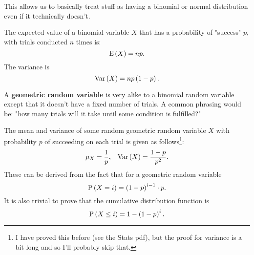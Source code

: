 This allows us to basically treat stuff as having a binomial or normal
distribution even if it technically doesn't.

The expected value of a binomial variable \( X \) that has a probability of "success" \( p \), with trials conducted \( n \) times is:
\[
    \operatorname{E} \left( X \right) = np
.\]
The variance is
\[
    \operatorname{Var} \left( X \right) = n p \left( 1 - p \right)
.\]

\begin{blackbox}
    \begin{definition}
        A \textbf{geometric random variable} is very alike to a binomial random variable except that it doesn't have a fixed number of trials. A common phrasing would be: "how many trials will it take until some condition is fulfilled?"
    \end{definition}
\end{blackbox}

The mean and variance of some random geometric random variable \( X \) with
probability \( p \) of succeeding on each trial is given as follows\footnote{I
have proved this before (see the Stats pdf), but the proof for variance is a
bit long and so I'll probably skip that.}:
\begin{align*}
    \mu_X &= \frac{1}{p}, & \operatorname{Var} \left( X \right) = \frac{1-p}{p^2}
.\end{align*}
These can be derived from the fact that for a geometric random variable
\[
    \operatorname{P} \left( X = i \right) = \left( 1 - p \right)^{i - 1} \cdot p
.\]
It is also trivial to prove that the cumulative distribution function is
\[
    \operatorname{P} \left( X \le i \right) = 1 - \left( 1 - p \right)^i
.\]
